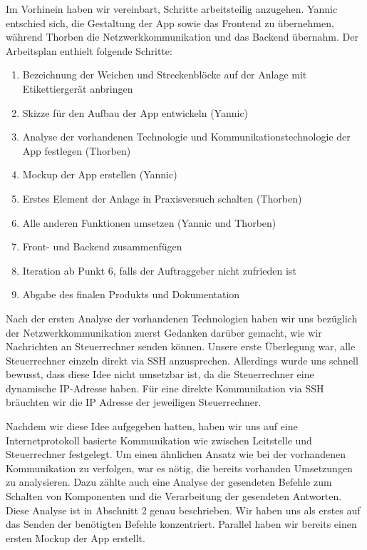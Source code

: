 \documentclass{article}
\begin{document}
Im Vorhinein haben wir vereinbart, Schritte arbeitsteilig anzugehen.
Yannic entschied sich, die Gestaltung der App sowie das Frontend zu übernehmen, während Thorben die Netzwerkkommunikation und das Backend übernahm.
Der Arbeitsplan enthielt folgende Schritte:
\begin{enumerate}
    \item Bezeichnung der Weichen und Streckenblöcke auf der Anlage mit Etikettiergerät anbringen
    \item Skizze für den Aufbau der App entwickeln (Yannic)
    \item Analyse der vorhandenen Technologie und Kommunikationstechnologie der App festlegen (Thorben)
    \item Mockup der App erstellen (Yannic)
    \item Erstes Element der Anlage in Praxisversuch schalten (Thorben)
    \item Alle anderen Funktionen umsetzen (Yannic und Thorben)
    \item Front- und Backend zusammenfügen
    \item Iteration ab Punkt 6, falls der Auftraggeber nicht zufrieden ist
    \item Abgabe des finalen Produkts und Dokumentation
\end{enumerate}

Nach der ersten Analyse der vorhandenen Technologien haben wir uns bezüglich der Netzwerkkommunikation zuerst Gedanken darüber gemacht, wie wir Nachrichten an Steuerrechner senden können.
Unsere erste Überlegung war, alle Steuerrechner einzeln direkt via SSH anzusprechen.
Allerdings wurde uns schnell bewusst, dass diese Idee nicht umsetzbar ist, da die Steuerrechner eine dynamische IP-Adresse haben.
Für eine direkte Kommunikation via SSH bräuchten wir die IP Adresse der jeweiligen Steuerrechner.

Nachdem wir diese Idee aufgegeben hatten, haben wir uns auf eine Internetprotokoll basierte Kommunikation wie zwischen Leitstelle und Steuerrechner festgelegt.
Um einen ähnlichen Ansatz wie bei der vorhandenen Kommunikation zu verfolgen, war es nötig, die bereits vorhanden Umsetzungen zu analysieren.
Dazu zählte auch eine Analyse der gesendeten Befehle zum Schalten von Komponenten und die Verarbeitung der gesendeten Antworten.
Diese Analyse ist in Abschnitt 2 genau beschrieben.
Wir haben uns als erstes auf das Senden der benötigten Befehle konzentriert.
Parallel haben wir bereits einen ersten Mockup der App erstellt.
\end{document}
